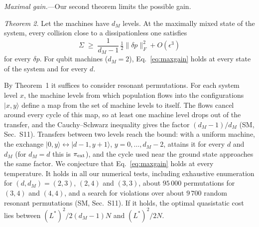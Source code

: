 \documentclass[aps,prl,reprint,superscriptaddress,amsmath,amssymb]{revtex4-2}
\begin{document}
\emph{Maximal gain.}---Our second theorem limits the possible gain.

\emph{Theorem 2.} Let the machines have $d_M$ levels. At the maximally mixed state of the system, every collision close
to a dissipationless one satisfies
\begin{equation}
\Sigma\;\geq\;\frac{1}{d_M-1}\,\tfrac12\|\delta p\|_F^2+O(\epsilon^3)
\label{eq:maxgain}
\end{equation}
for every $\delta p$. For qubit machines ($d_M=2$), Eq.~\eqref{eq:maxgain} holds at every state of the system and for
every $d$.

By Theorem~1 it suffices to consider resonant permutations. For each system level $x$, the machine levels from which
population flows into the configurations $|x,y\rangle$ define a map from the set of machine levels to itself. The flows
cancel around every cycle of this map, so at least one machine level drops out of the transfer, and the Cauchy--Schwarz
inequality gives the factor $(d_M-1)/d_M$ (SM, Sec.~S11). Transfers between two levels reach the bound: with a uniform
machine, the exchange $|0,y\rangle\leftrightarrow|d-1,y+1\rangle$, $y=0,\dots,d_M-2$, attains it for every $d$ and $d_M$
(for $d_M=d$ this is $\pi_{\rm ext}$), and the cycle used near the ground state approaches the same factor. We
conjecture that Eq.~\eqref{eq:maxgain} holds at every temperature. It holds in all our numerical tests, including
exhaustive enumeration for $(d,d_M)=(2,3)$, $(2,4)$ and $(3,3)$, about $95\,000$ permutations for $(3,4)$ and $(4,4)$,
and a search for violations over about $9\,700$ random resonant permutations (SM, Sec.~S11). If it holds, the optimal
quasistatic cost lies between $(L^*)^2/2(d_M-1)N$ and $(L^*)^2/2N$.
\end{document}
